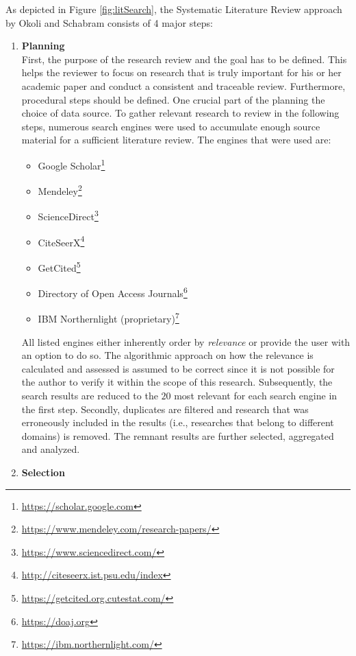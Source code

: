 As depicted in Figure \ref{fig:litSearch}, the Systematic Literature Review approach by Okoli and Schabram consists of 4 major steps: \\
\begin{enumerate}
    \item
    \textbf{Planning}\\
    First, the purpose of the research review and the goal has to be defined. This helps the reviewer to focus on research that is truly important for his or her academic paper and conduct a consistent and traceable review. Furthermore, procedural steps should be defined. One crucial part of the planning the choice of data source. To gather relevant research to review in the following steps, numerous search engines were used to accumulate enough source material for a sufficient literature review. The engines that were used are: 
    \begin{itemize}
        \renewcommand\labelitemi{--}
        \item Google Scholar\footnote{\url{https://scholar.google.com}}
        \item Mendeley\footnote{\url{https://www.mendeley.com/research-papers/}}
        \item ScienceDirect\footnote{\url{https://www.sciencedirect.com/}}
        \item CiteSeerX\footnote{\url{http://citeseerx.ist.psu.edu/index}}
        \item GetCited\footnote{\url{https://getcited.org.cutestat.com/}}
        \item Directory of Open Access Journals\footnote{\url{https://doaj.org}}
        \item IBM Northernlight (proprietary)\footnote{\url{https://ibm.northernlight.com/}}
    \end{itemize}
    All listed engines either inherently order by \textit{relevance} or provide the user with an option to do so. The algorithmic approach on how the relevance is calculated and assessed is assumed to be correct since it is not possible for the author to verify it within the scope of this research. Subsequently, the search results are reduced to the $20$ most relevant for each search engine in the first step. Secondly, duplicates are filtered and research that was erroneously included in the results (i.e., researches that belong to different domains) is removed. The remnant results are further selected, aggregated and analyzed.
    \item
    \textbf{Selection}\\

\end{enumerate}

